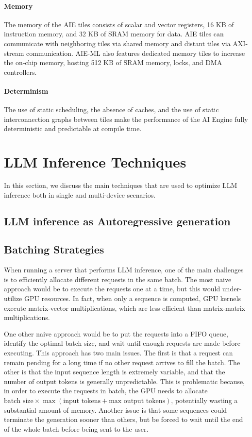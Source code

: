 \documentclass[conference]{IEEEtran}
\begin{document}
\paragraph{Memory}
The memory of the AIE tiles consists of scalar and vector registers, 16 KB of instruction memory, and 32 KB of SRAM memory for data. AIE tiles can communicate with neighboring tiles via shared memory and distant tiles via AXI-stream communication. AIE-ML also features dedicated memory tiles to increase the on-chip memory, hosting 512 KB of SRAM memory, locks, and DMA controllers.
\paragraph{Determinism}
The use of static scheduling, the absence of caches, and the use of static interconnection graphs between tiles make the performance of the AI Engine fully deterministic and predictable at compile time.

\section{LLM Inference Techniques}
In this section, we discuss the main techniques that are used to optimize LLM inference both in single and multi-device scenarios. 
\subsection{LLM inference as Autoregressive generation}

\subsection{Batching Strategies}
When running a server that performs LLM inference, one of the main challenges is to efficiently allocate different requests in the same batch. The most naive approach would be to execute the requests one at a time, but this would under-utilize GPU resources. In fact, when only a sequence is computed, GPU kernels execute matrix-vector multiplications, which are less efficient than matrix-matrix multiplications.

One other naive approach would be to put the requests into a FIFO queue, identify the optimal batch size, and wait until enough requests are made before executing. This approach has two main issues. The first is that a request can remain pending for a long time if no other request arrives to fill the batch. The other is that the input sequence length is extremely variable, and that the number of output tokens is generally unpredictable. This is problematic because, in order to execute the requests in batch, the GPU needs to allocate $\text{batch size} \times \max(\text{input tokens}+\text{max output tokens})$, potentially wasting a substantial amount of memory. Another issue is that some sequences could terminate the generation sooner than others, but be forced to wait until the end of the whole batch before being sent to the user.
\end{document}

